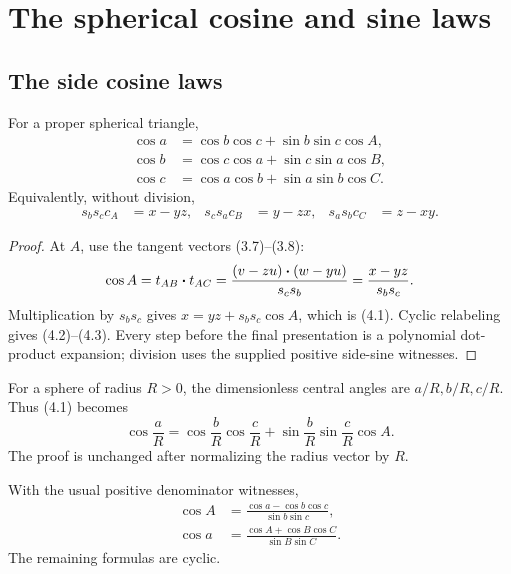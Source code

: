 \section{The spherical cosine and sine laws}
\label{sec:core-laws}

\subsection{The side cosine laws}

\begin{theorem}
\label{thm:side-cosine}
For a proper spherical triangle,
\begin{align}
 \cos a&=\cos b\cos c+\sin b\sin c\cos A,                 \tag{4.1}\\
 \cos b&=\cos c\cos a+\sin c\sin a\cos B,                 \tag{4.2}\\
 \cos c&=\cos a\cos b+\sin a\sin b\cos C.                 \tag{4.3}
\end{align}
Equivalently, without division,
\begin{align}
 s_bs_c c_A&=x-yz,&
 s_cs_a c_B&=y-zx,&
 s_as_b c_C&=z-xy.                                        \tag{4.4}
\end{align}
\end{theorem}

\begin{proof}
At \(A\), use the tangent vectors (3.7)--(3.8):
\[
 \cos A=t_{AB}\mathbin{\boldsymbol{\cdot}} t_{AC}
 =\frac{(v-zu)\mathbin{\boldsymbol{\cdot}}(w-yu)}{s_cs_b}
 =\frac{x-yz}{s_bs_c}.
\]
Multiplication by \(s_bs_c\) gives
\(x=yz+s_bs_c\cos A\), which is (4.1).  Cyclic relabeling gives
(4.2)--(4.3).  Every step before the final presentation is a polynomial dot-
product expansion; division uses the supplied positive side-sine witnesses.
\end{proof}

For a sphere of radius \(R>0\), the dimensionless central angles are
\(a/R,b/R,c/R\).  Thus (4.1) becomes
\[
 \cos\frac aR=\cos\frac bR\cos\frac cR+
 \sin\frac bR\sin\frac cR\cos A.                           \tag{4.5}
\]
The proof is unchanged after normalizing the radius vector by \(R\).

\begin{corollary}
\label{cor:rearranged-cosine}
With the usual positive denominator witnesses,
\begin{align}
 \cos A&=\frac{\cos a-\cos b\cos c}{\sin b\sin c},         \tag{4.6}\\
 \cos a&=\frac{\cos A+\cos B\cos C}{\sin B\sin C}.         \tag{4.7}
\end{align}
The remaining formulas are cyclic.
\end{corollary}

